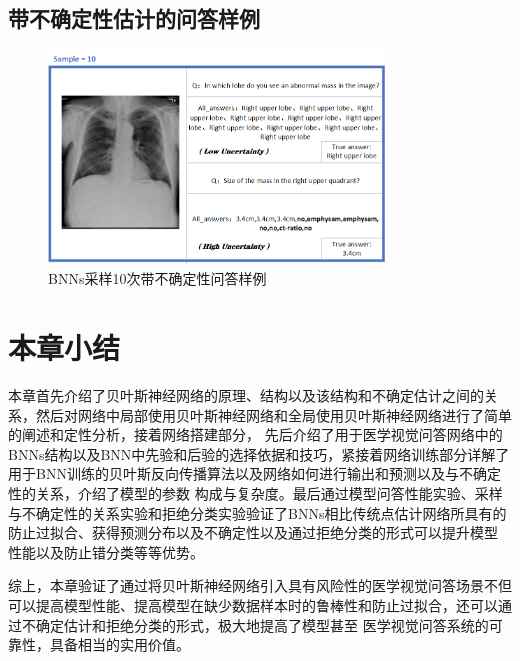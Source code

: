 \subsection{带不确定性估计的问答样例}
\begin{figure}[htbp]
	\centering	
	\includegraphics[width=0.8\textwidth]{Fig/myfig/chapter4/qadamo.png}  %
	\caption{\label{qademo}BNNs采样10次带不确定性问答样例} 
\end{figure}

\section{本章小结}
本章首先介绍了贝叶斯神经网络的原理、结构以及该结构和不确定估计之间的关系，然后对网络中局部使用贝叶斯神经网络和全局使用贝叶斯神经网络进行了简单的阐述和定性分析，接着网络搭建部分，
先后介绍了用于医学视觉问答网络中的BNNs结构以及BNN中先验和后验的选择依据和技巧，紧接着网络训练部分详解了用于BNN训练的贝叶斯反向传播算法以及网络如何进行输出和预测以及与不确定性的关系，介绍了模型的参数
构成与复杂度。最后通过模型问答性能实验、采样与不确定性的关系实验和拒绝分类实验验证了BNNs相比传统点估计网络所具有的防止过拟合、获得预测分布以及不确定性以及通过拒绝分类的形式可以提升模型
性能以及防止错分类等等优势。

综上，本章验证了通过将贝叶斯神经网络引入具有风险性的医学视觉问答场景不但可以提高模型性能、提高模型在缺少数据样本时的鲁棒性和防止过拟合，还可以通过不确定估计和拒绝分类的形式，极大地提高了模型甚至
医学视觉问答系统的可靠性，具备相当的实用价值。

